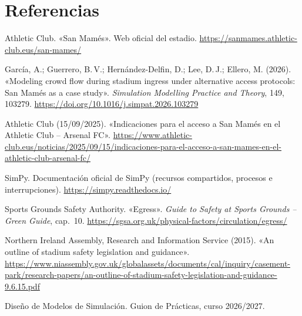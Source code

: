 \section*{Referencias}

\begin{description}[style=nextline,leftmargin=2.2em,font=\bfseries\color{azul}]
  \item[F1] Athletic Club. «San Mamés». Web oficial del estadio.
    \url{https://sanmames.athletic-club.eus/san-mames/}
  \item[F2] García, A.; Guerrero, B.\,V.; Hernández-Delfin, D.; Lee, D.\,J.; Ellero, M. (2026).
    «Modeling crowd flow during stadium ingress under alternative access protocols:
    San Mamés as a case study». \emph{Simulation Modelling Practice and Theory}, 149,
    103279. \url{https://doi.org/10.1016/j.simpat.2026.103279}
  \item[F3] Athletic Club (15/09/2025). «Indicaciones para el acceso a San Mamés en el
    Athletic Club -- Arsenal FC».
    \url{https://www.athletic-club.eus/noticias/2025/09/15/indicaciones-para-el-acceso-a-san-mames-en-el-athletic-club-arsenal-fc/}
  \item[F4] SimPy. Documentación oficial de SimPy (recursos compartidos, procesos e
    interrupciones). \url{https://simpy.readthedocs.io/}
  \item[F5] Sports Grounds Safety Authority. «Egress». \emph{Guide to Safety at Sports
    Grounds -- Green Guide}, cap.~10. \url{https://sgsa.org.uk/physical-factors/circulation/egress/}
  \item[F6] Northern Ireland Assembly, Research and Information Service (2015). «An
    outline of stadium safety legislation and guidance».
    \url{https://www.niassembly.gov.uk/globalassets/documents/cal/inquiry/casement-park/research-papers/an-outline-of-stadium-safety-legislation-and-guidance-9.6.15.pdf}
  \item[D1] Diseño de Modelos de Simulación. Guion de Prácticas, curso 2026/2027.
\end{description}
